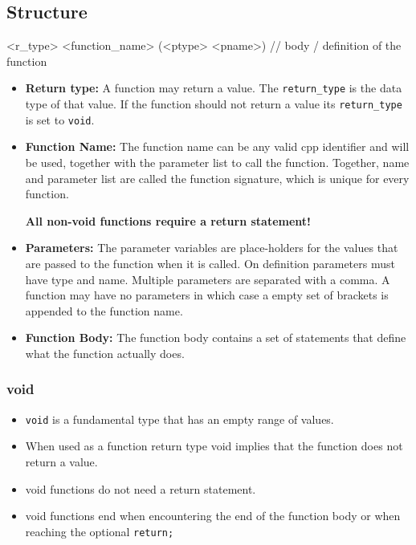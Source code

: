 \documentclass[10pt,a4paper]{scrartcl}
\begin{document}
\begin{multicols*}{2}
\subsection{Structure}
\label{sec:Structure}

\begin{TPCpp}
<r_type> <function_name> (<ptype> <pname>) {
	// body / definition of the function
}
\end{TPCpp}

\begin{itemize}
\item \textbf{Return type: } A function may return a value. The \verb+return_type+ is the data type of that value. If the function should not return a value its \verb+return_type+ is set to \verb+void+.
\item \textbf{Function Name:} The function name can be any valid cpp identifier and will be used, together with the parameter list to call the function. Together, name and parameter list are called the function signature, which is unique for every function. 

\textbf{All non-void functions require a return statement!}
\item \textbf{Parameters:} The parameter variables are place-holders for the values that are passed to the function when it is called. On definition parameters must have type and name. Multiple parameters are separated with a comma. A function may have no parameters in which case a empty set of brackets is appended to the function name.
\item \textbf{Function Body:} The function body contains a set of statements that define what the function actually does.
\end{itemize}

\subsubsection{void}
\label{sec:Void}

\begin{itemize}
\item \verb+void+ is a fundamental type that has an empty range of values.
\item When used as a function return type void implies that the function does not return a value.
\item void functions do not need a return statement.
\item void functions end when encountering the end of the function body or when reaching the optional \verb+return;+
\end{itemize}


\end{multicols*}
\end{document}
